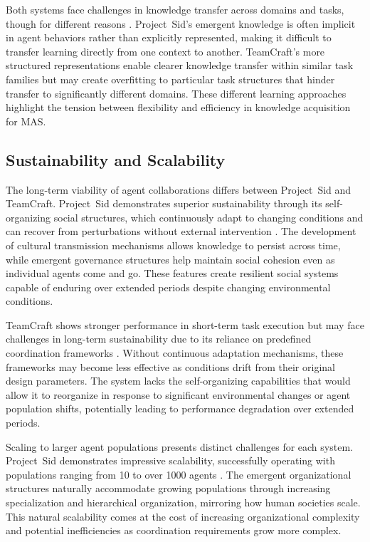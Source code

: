 \documentclass[a4paper, 12pt]{article}
\begin{document}
Both systems face challenges in knowledge transfer across domains and tasks, though for different reasons \autocite{Altera2024, Long2024, Zhao2024}. Project~Sid's emergent knowledge is often implicit in agent behaviors rather than explicitly represented, making it difficult to transfer learning directly from one context to another. TeamCraft's more structured representations enable clearer knowledge transfer within similar task families but may create overfitting to particular task structures that hinder transfer to significantly different domains. These different learning approaches highlight the tension between flexibility and efficiency in knowledge acquisition for MAS.

\subsection{Sustainability and Scalability}

The long-term viability of agent collaborations differs between Project~Sid and TeamCraft. Project~Sid demonstrates superior sustainability through its self-organizing social structures, which continuously adapt to changing conditions and can recover from perturbations without external intervention \autocite{Altera2024, Yu2024}. The development of cultural transmission mechanisms allows knowledge to persist across time, while emergent governance structures help maintain social cohesion even as individual agents come and go. These features create resilient social systems capable of enduring over extended periods despite changing environmental conditions.

TeamCraft shows stronger performance in short-term task execution but may face challenges in long-term sustainability due to its reliance on predefined coordination frameworks \autocite{Long2024}. Without continuous adaptation mechanisms, these frameworks may become less effective as conditions drift from their original design parameters. The system lacks the self-organizing capabilities that would allow it to reorganize in response to significant environmental changes or agent population shifts, potentially leading to performance degradation over extended periods.

Scaling to larger agent populations presents distinct challenges for each system. Project~Sid demonstrates impressive scalability, successfully operating with populations ranging from 10 to over 1000 agents \autocite{Altera2024}. The emergent organizational structures naturally accommodate growing populations through increasing specialization and hierarchical organization, mirroring how human societies scale. This natural scalability comes at the cost of increasing organizational complexity and potential inefficiencies as coordination requirements grow more complex.
\end{document}

